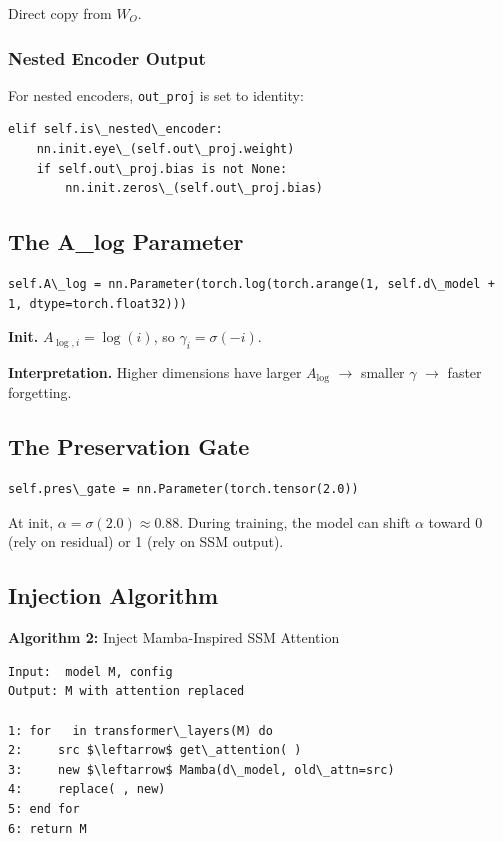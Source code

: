 Direct copy from $W_O$.

\subsubsection{Nested Encoder Output}

For nested encoders, \texttt{out\_proj} is set to identity:

\begin{lstlisting}
elif self.is\_nested\_encoder:
    nn.init.eye\_(self.out\_proj.weight)
    if self.out\_proj.bias is not None:
        nn.init.zeros\_(self.out\_proj.bias)
\end{lstlisting}

\subsection{The A\_log Parameter}

\begin{lstlisting}
self.A\_log = nn.Parameter(torch.log(torch.arange(1, self.d\_model + 1, dtype=torch.float32)))
\end{lstlisting}

\textbf{Init.} $A_{\log, i} = \log(i)$, so $\gamma_i = \sigma(-i)$.

\textbf{Interpretation.} Higher dimensions have larger $A_{\log}$ $\to$ smaller $\gamma$ 
$\to$ faster forgetting.

\subsection{The Preservation Gate}

\begin{lstlisting}
self.pres\_gate = nn.Parameter(torch.tensor(2.0))
\end{lstlisting}

At init, $\alpha = \sigma(2.0) \approx 0.88$. During training, the model can 
shift $\alpha$ toward 0 (rely on residual) or 1 (rely on SSM output).

\subsection{Injection Algorithm}

\textbf{Algorithm 2:} Inject Mamba-Inspired SSM Attention
\begin{lstlisting}
Input:  model M, config
Output: M with attention replaced

1: for   in transformer\_layers(M) do
2:     src $\leftarrow$ get\_attention( )
3:     new $\leftarrow$ Mamba(d\_model, old\_attn=src)
4:     replace( , new)
5: end for
6: return M
\end{lstlisting}


